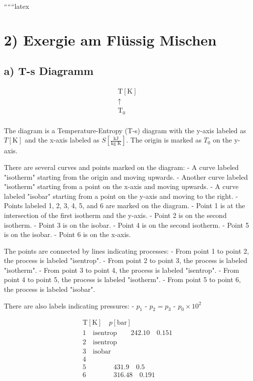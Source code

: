 
``````latex


\section*{2) Exergie am Flüssig Mischen}

\subsection*{a) T-s Diagramm}

\[
\begin{array}{c}
\text{T} [\text{K}] \\
\uparrow \\
\text{T}_0 \\
\end{array}
\]

\noindent
The diagram is a Temperature-Entropy (T-s) diagram with the y-axis labeled as \( T [\text{K}] \) and the x-axis labeled as \( S [\frac{\text{kJ}}{\text{kg K}}] \). The origin is marked as \( T_0 \) on the y-axis. 

There are several curves and points marked on the diagram:
- A curve labeled "isotherm" starting from the origin and moving upwards.
- Another curve labeled "isotherm" starting from a point on the x-axis and moving upwards.
- A curve labeled "isobar" starting from a point on the y-axis and moving to the right.
- Points labeled 1, 2, 3, 4, 5, and 6 are marked on the diagram.
- Point 1 is at the intersection of the first isotherm and the y-axis.
- Point 2 is on the second isotherm.
- Point 3 is on the isobar.
- Point 4 is on the second isotherm.
- Point 5 is on the isobar.
- Point 6 is on the x-axis.

The points are connected by lines indicating processes:
- From point 1 to point 2, the process is labeled "isentrop".
- From point 2 to point 3, the process is labeled "isotherm".
- From point 3 to point 4, the process is labeled "isentrop".
- From point 4 to point 5, the process is labeled "isotherm".
- From point 5 to point 6, the process is labeled "isobar".

There are also labels indicating pressures:
- \( p_1 \)
- \( p_2 = p_3 \)
- \( p_0 \times 10^2 \)

\[
\begin{array}{c}
\text{T} [\text{K}] \quad p [\text{bar}] \\
1 \quad \text{isentrop} \quad \quad 242.10 \quad 0.151 \\
2 \quad \text{isentrop} \quad \quad \\
3 \quad \text{isobar} \quad \quad \\
4 \quad \quad \quad \quad \\
5 \quad \quad \quad \quad 431.9 \quad 0.5 \\
6 \quad \quad \quad \quad 316.48 \quad 0.191 \\
\end{array}
\]

